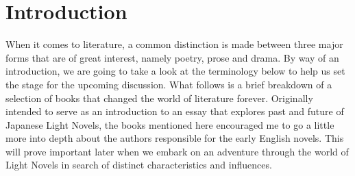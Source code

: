 \section{Introduction}

When it comes to literature, a common distinction is made between three major 
forms that are of great interest, namely poetry, prose and drama. By way of 
an introduction, we are going to take a look at the terminology below to help 
us set the stage for the upcoming discussion. What follows is a brief breakdown 
of a selection of books that changed the world of literature forever. Originally
intended to serve as an introduction to an essay that explores past and future 
of Japanese Light Novels, the books mentioned here encouraged me to go a little 
more into depth about the authors responsible for the early English novels. This
will prove important later when we embark on an adventure through the world of 
Light Novels in search of distinct characteristics and influences.
